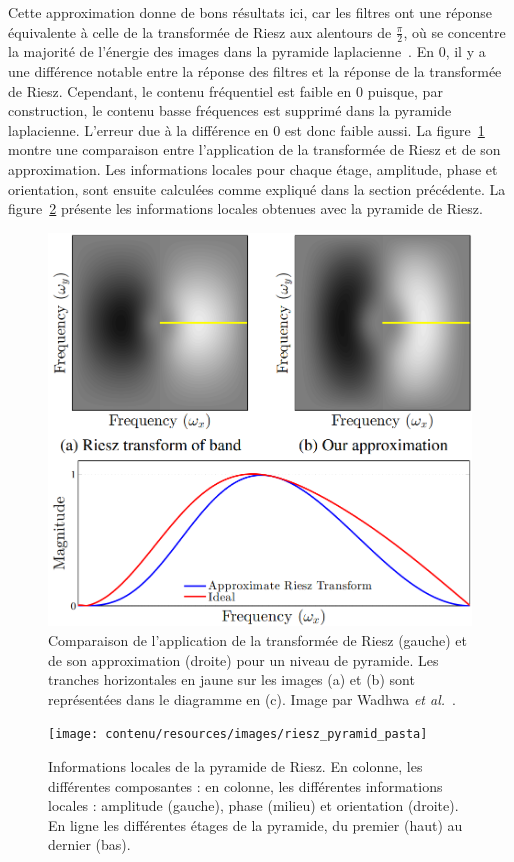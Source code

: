 \noindent Cette approximation donne de bons résultats ici, car les filtres ont une réponse équivalente à celle de la transformée de Riesz aux alentours de $\frac\pi2$, où se concentre la majorité de l'énergie des images dans la pyramide laplacienne~\cite{wadhwa_riesz_2014}. En $0$, il y a une différence notable entre la réponse des filtres et la réponse de la transformée de Riesz. Cependant, le contenu fréquentiel est faible en $0$ puisque, par construction, le contenu basse fréquences est supprimé dans la pyramide laplacienne. L'erreur due à la différence en $0$ est donc faible aussi. La figure~\ref{fig:riesz-approximation} montre une comparaison entre l'application de la transformée de Riesz et de son approximation. Les informations locales pour chaque étage, amplitude, phase et orientation, sont ensuite calculées comme expliqué dans la section précédente. La figure~\ref{fig:riesz-pyramid-local} présente les informations locales obtenues avec la pyramide de Riesz.

\bigskip

\begin{figure}
    \centering
    \includegraphics[width=.65\textwidth]{contenu/resources/images/riesz_approximation}
    \caption[Approximation de la transformée de Riesz]{Comparaison de l'application de la transformée de Riesz (gauche) et de son approximation (droite) pour un niveau de pyramide. Les tranches horizontales en jaune sur les images (a) et (b) sont représentées dans le diagramme en (c). Image par Wadhwa \textit{et al.}~\cite{wadhwa_riesz_2014}.}
    \label{fig:riesz-approximation}
\end{figure}

\begin{figure}[hp]
    \centering
    \texttt{[image: contenu/resources/images/riesz\_pyramid\_pasta]}
    \caption[Informations locales de la pyramide de Riesz]{Informations locales de la pyramide de Riesz. En colonne, les différentes composantes : en colonne, les différentes informations locales : amplitude (gauche), phase (milieu) et orientation (droite). En ligne les différentes étages de la pyramide, du premier (haut) au dernier (bas).}
    \label{fig:riesz-pyramid-local}
\end{figure}

